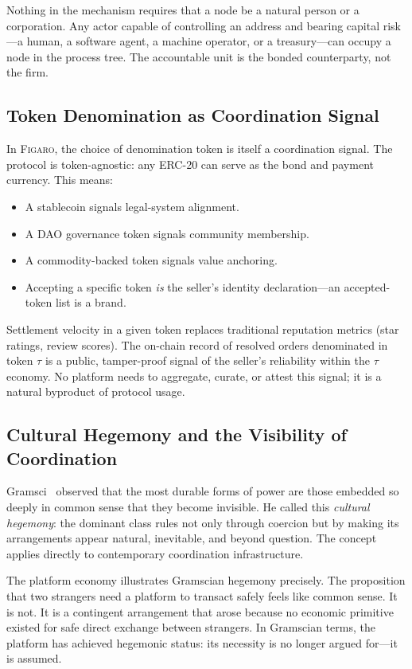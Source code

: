 \documentclass[11pt,a4paper]{article}
\theoremstyle{definition}
\theoremstyle{remark}
\newcommand{\figaro}{\textsc{Figaro}}
\begin{document}
Nothing in the mechanism requires that a node be a natural person or a
corporation. Any actor capable of controlling an address and bearing
capital risk---a human, a software agent, a machine operator, or a
treasury---can occupy a node in the process tree. The accountable unit
is the bonded counterparty, not the firm.

\subsection{Token Denomination as Coordination Signal}

In \figaro{}, the choice of denomination token is itself a coordination
signal. The protocol is token-agnostic: any ERC-20 can serve as
the bond and payment currency. This means:

\begin{itemize}
  \item A stablecoin signals legal-system alignment.
  \item A DAO governance token signals community membership.
  \item A commodity-backed token signals value anchoring.
  \item Accepting a specific token \emph{is} the seller's identity
    declaration---an accepted-token list is a brand.
\end{itemize}

Settlement velocity in a given token replaces traditional reputation
metrics (star ratings, review scores). The on-chain record of resolved
orders denominated in token $\tau$ is a public, tamper-proof signal of
the seller's reliability within the $\tau$ economy. No platform needs to
aggregate, curate, or attest this signal; it is a natural byproduct of
protocol usage.

\subsection{Cultural Hegemony and the Visibility of Coordination}

Gramsci~\citeyearpar{gramsci1971} observed that the most durable forms of
power are those embedded so deeply in common sense that they become
invisible. He called this \emph{cultural hegemony}: the dominant class
rules not only through coercion but by making its arrangements appear
natural, inevitable, and beyond question. The concept applies directly
to contemporary coordination infrastructure.

The platform economy illustrates Gramscian hegemony precisely. The
proposition that two strangers need a platform to transact safely feels
like common sense. It is not. It is a contingent arrangement that arose
because no economic primitive existed for safe direct exchange between
strangers. In Gramscian terms, the platform has achieved hegemonic
status: its necessity is no longer argued for---it is assumed.
\end{document}
